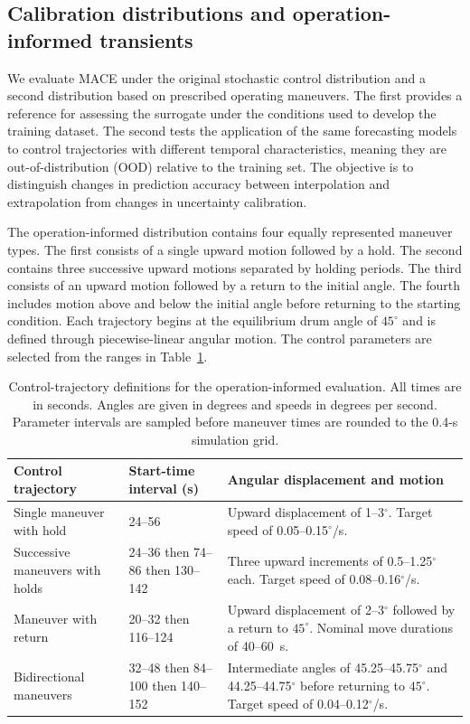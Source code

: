 \subsection{Calibration distributions and operation-informed transients}
\label{sec:methods:transfer}

We evaluate MACE under the original stochastic control distribution and a second distribution based on prescribed operating maneuvers. The first provides a reference for assessing the surrogate under the conditions used to develop the training dataset. The second tests the application of the same forecasting models to control trajectories with different temporal characteristics, meaning they are out-of-distribution (OOD) relative to the training set. The objective is to distinguish changes in prediction accuracy between interpolation and extrapolation from changes in uncertainty calibration.

The operation-informed distribution contains four equally represented maneuver types. The first consists of a single upward motion followed by a hold. The second contains three successive upward motions separated by holding periods. The third consists of an upward motion followed by a return to the initial angle. The fourth includes motion above and below the initial angle before returning to the starting condition. Each trajectory begins at the equilibrium drum angle of $45^\circ$ and is defined through piecewise-linear angular motion. The control parameters are selected from the ranges in Table~\ref{tab:mace:families}.

\begin{table}[t]
\centering\small
\caption{Control-trajectory definitions for the operation-informed evaluation. All times are in seconds. Angles are given in degrees and speeds in degrees per second. Parameter intervals are sampled before maneuver times are rounded to the 0.4-s simulation grid.}
\label{tab:mace:families}
\begin{tabular}{@{}p{}p{}p{}@{}}
\toprule
Control trajectory & Start-time interval (s) & Angular displacement and motion\\
\midrule
Single maneuver with hold & 24--56 & Upward displacement of 1--3$^\circ$. Target speed of 0.05--0.15$^\circ$/s.\\
Successive maneuvers with holds & 24--36 then 74--86 then 130--142 & Three upward increments of 0.5--1.25$^\circ$ each. Target speed of 0.08--0.16$^\circ$/s.\\
Maneuver with return & 20--32 then 116--124 & Upward displacement of 2--3$^\circ$ followed by a return to $45^\circ$. Nominal move durations of 40--60~s.\\
Bidirectional maneuvers & 32--48 then 84--100 then 140--152 & Intermediate angles of 45.25--45.75$^\circ$ and 44.25--44.75$^\circ$ before returning to $45^\circ$. Target speed of 0.04--0.12$^\circ$/s.\\
\bottomrule
\end{tabular}
\end{table}

